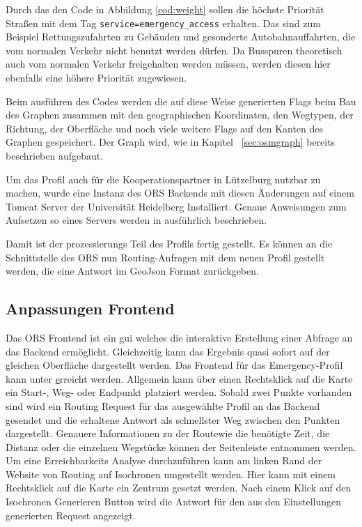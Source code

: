 \documentclass[12pt,a4paper]{article}
\begin{document}
Durch das den Code in Abbildung \ref{cod:weight} sollen die höchste Priorität Straßen mit dem Tag \lstinline!service=emergency_access! erhalten. Das sind zum Beispiel Rettungszufahrten zu Gebäuden und gesonderte Autobahnauffahrten, die vom normalen Verkehr nicht benutzt werden dürfen. Da Busspuren theoretisch auch vom normalen Verkehr freigehalten werden müssen, werden diesen hier ebenfalls eine höhere Priorität zugewiesen.

Beim ausführen des Codes werden die auf diese Weise generierten Flags beim Bau des Graphen zusammen mit den geographischen Koordinaten, den Wegtypen, der Richtung, der Oberfläche und noch viele weitere Flags auf den Kanten des Graphen gespeichert. Der Graph wird, wie in Kapitel ~\ref{sec:osmgraph} bereits beschrieben aufgebaut.

Um das Profil auch für die Kooperationspartner in Lützelburg nutzbar zu machen, wurde eine Instanz des ORS Backends mit diesen Änderungen auf einem Tomcat Server der Universität Heidelberg Installiert. Genaue Anweisungen zum Aufsetzen so eines Servers werden in \cite{neisdoktor} ausführlich beschrieben. 

Damit ist der prozessierungs  Teil des Profils fertig gestellt. Es können an die Schnittstelle des ORS nun Routing-Anfragen mit dem neuen Profil gestellt werden, die eine Antwort im GeoJson Format zurückgeben.

%
%
%
%

\subsection{Anpassungen Frontend}

Das ORS Frontend ist ein \gls{gui} welches die interaktive Erstellung einer Abfrage an das Backend ermöglicht. Gleichzeitig kann das Ergebnis quasi sofort auf der gleichen Oberfläche  dargestellt werden. Das Frontend für das Emergency-Profil kann unter \href{www.emergency.openrouteservice.org} erreicht werden.
Allgemein kann über einen Rechtsklick auf die Karte ein Start-, Weg- oder Endpunkt platziert werden. Sobald zwei Punkte vorhanden sind wird ein Routing Request für das ausgewählte Profil an das Backend gesendet und die erhaltene Antwort als schnellster Weg zwischen den Punkten dargestellt. Genauere Informationen zu der Routewie die benötigte Zeit, die Distanz oder die einzelnen Wegstücke können der Seitenleiste entnommen werden.
Um eine Erreichbarkeits Analyse durchzuführen kann am linken Rand der Website von Routing auf Isochronen umgestellt werden. Hier kann mit einem Rechtsklick auf die Karte ein Zentrum gesetzt werden. Nach einem Klick auf den Isochronen Generieren Button wird die Antwort für den aus den Einstellungen generierten Request angezeigt.
\end{document}
